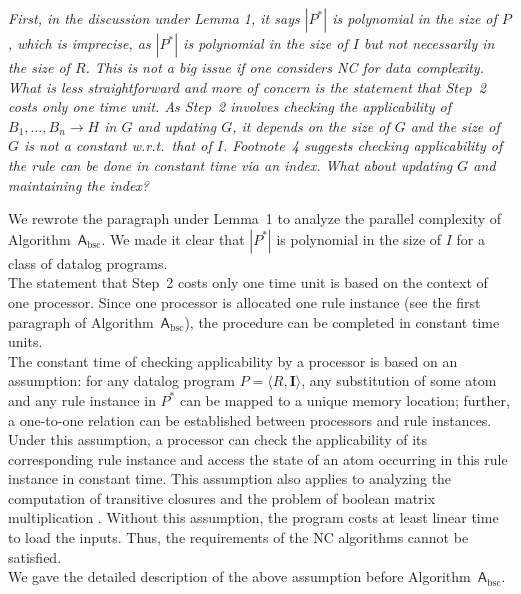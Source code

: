 \documentclass{article}
\let\quoteOld\quote
\let\endquoteOld\endquote
\renewenvironment{quote}{\quoteOld\itshape}{\endquoteOld}
\begin{document}
\begin{quote}
First, in the discussion under Lemma 1, it says $|P^*|$ is polynomial in the size of $P$, which is imprecise, as $|P^*|$ is polynomial in the size of $I$ but not necessarily in the size of $R$. This is not a big issue if one considers NC for data complexity. What is less straightforward and more of concern is the statement that Step~2 costs only one time unit. As Step~2 involves checking the applicability of $B_1, \ldots, B_n \to H$ in $G$ and updating $G$, it depends on the size of $G$ and the size of $G$ is not a constant w.r.t.\ that of $I$. Footnote~4 suggests checking applicability of the rule can be done in constant time via an index. What about updating $G$ and maintaining the index?
\end{quote}

We rewrote the paragraph under Lemma~1 to analyze the parallel complexity of Algorithm~$\mathsf{A}_{\text{bsc}}$.
We made it clear that $|P^*|$ is polynomial in the size of $I$ for a class of datalog programs.\\

The statement that Step~2 costs only one time unit is based on the context of one processor. Since one processor
is allocated one rule instance (see the first paragraph of Algorithm~$\mathsf{A}_{\text{bsc}}$),
the procedure can be completed in constant time units. \\

The constant time of checking applicability by a processor is based on an assumption:
for any datalog program $P=\langle R, \textbf{I}\rangle$,
any substitution of some atom and any rule instance in $P^*$ can be mapped to a unique memory
location; further, a one-to-one relation can be established between processors and rule instances.
Under this assumption, a processor can check the applicability of its corresponding
rule instance and access the state of an atom occurring in this rule instance in constant time.
This assumption also applies to analyzing the computation of transitive closures \cite{Allender07} and
the problem of boolean matrix multiplication \cite{Raymond95}. Without this assumption, the program
costs at least linear time to load the inputs. Thus, the requirements of the NC algorithms
cannot be satisfied.\\

We gave the detailed description of the above assumption before Algorithm~$\mathsf{A}_{\text{bsc}}$.
\end{document}
